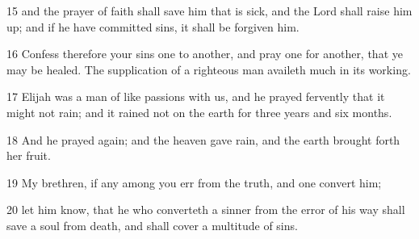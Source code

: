 \par 15 and the prayer of faith shall save him that is sick, and the Lord shall raise him up; and if he have committed sins, it shall be forgiven him.
\par 16 Confess therefore your sins one to another, and pray one for another, that ye may be healed. The supplication of a righteous man availeth much in its working.
\par 17 Elijah was a man of like passions with us, and he prayed fervently that it might not rain; and it rained not on the earth for three years and six months.
\par 18 And he prayed again; and the heaven gave rain, and the earth brought forth her fruit.
\par 19 My brethren, if any among you err from the truth, and one convert him;
\par 20 let him know, that he who converteth a sinner from the error of his way shall save a soul from death, and shall cover a multitude of sins.

